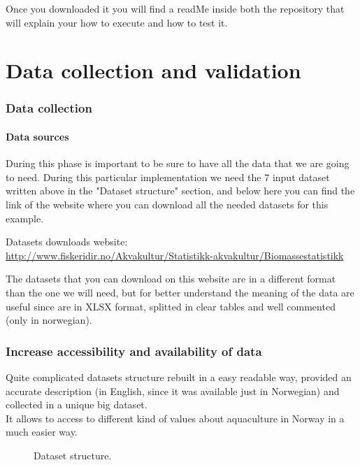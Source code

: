 Once you downloaded it you will find a readMe inside both the repository that will explain your how to execute and how to test it.

\part{Data collection and validation}
\newpage
\section{Data collection}
\subsection{Data sources}
During this phase is important to be sure to have all the data that we are going to need. During this particular implementation we need the 7 input dataset written above in the "Dataset structure" section, and below here you can find the link of the website where you can download all the needed datasets for this example.

Datasets downloads website:\\ 
\url{http://www.fiskeridir.no/Akvakultur/Statistikk-akvakultur/Biomassestatistikk}

The datasets that you can download on this website are in a different format than the one we will need, but for better understand the meaning of the data are useful since are in XLSX format, splitted in clear tables and well commented (only in norwegian).

\newpage

\section{Increase accessibility and availability of data}
Quite complicated datasets structure rebuilt in a easy readable way, provided an accurate description (in English, since it was available just in Norwegian) and collected in a unique big dataset. \\
It allows to access to different kind of values about aquaculture in Norway in a much easier way.

\begin{figure}[H]
	
    \caption{Dataset structure.}
\end{figure}


